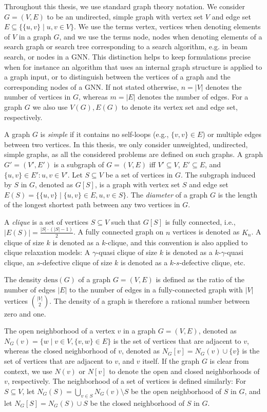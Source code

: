 \documentclass[draft,final]{vutinfth} %
\begin{document}
Throughout this thesis, we use standard graph theory notation. 
We consider $G = (V, E)$ to be an undirected, simple graph with vertex set $V$ and edge set $E \subseteq \{\{u,v\} \mid u,v \in V\}$. We use the terms vertex, vertices when denoting elements of $V$ in a graph $G$, and we use the terms node, nodes when denoting elements of a search graph or search tree corresponding to a search algorithm, e.g. in beam search, or nodes in a GNN. This distinction helps to keep formulations precise when for instance an algorithm that uses an internal graph structure is applied to a graph input, or to distinguish between the vertices of a graph and the corresponding nodes of a GNN. 
If not stated otherwise, $n = |V|$ denotes the number of vertices in $G$, whereas $m = |E|$ denotes the number of edges. 
For a graph $G$ we also use $V(G), E(G)$ to denote its vertex set and edge set, respectively. 

A graph $G$ is \emph{simple} if it contains no self-loops (e.g.,  $\{v,v\} \in E$) or multiple edges between two vertices. In this thesis, we only consider unweighted, undirected, simple graphs, as all the considered problems are defined on such graphs. 
A graph $G' = (V', E')$ is a subgraph of $G = (V,E)$ iff $V' \subseteq V$, $E' \subseteq E$, and $\{u,v\} \in E' \colon u,v \in V'$. Let $S \subseteq V$ be a set of vertices in $G$. The subgraph induced by $S$ in $G$, denoted as $G[S]$, is a graph with vertex set $S$ and edge set $E(S) = \{ \{u,v\} \mid \{u,v\} \in E, u,v \in S \}$. 
The \emph{diameter} of a graph $G$ is the length of the longest shortest path between any two vertices in $G$. 

A \emph{clique} is a set of vertices $S \subseteq V$ such that $G[S]$ is fully connected, i.e., $|E(S)| = \frac{|S| \cdot (|S|-1)}{2}$. A fully connected graph on $n$ vertices is denoted as $K_n$. A clique of size $k$ is denoted as a $k$-clique, and this convention is also applied to clique relaxation models: A $\gamma$-quasi clique of size $k$ is denoted as a $k$-$\gamma$-quasi clique, an $s$-defective clique of size $k$ is denoted as a $k$-$s$-defective clique, etc. 

The density $\mathrm{dens}(G)$ of a graph $G = (V,E)$ is defined as the ratio of the number of edges $|E|$ to the number of edges in a fully-connected graph with $|V|$ vertices $\binom{|V|}{2}$. 
The density of a graph is therefore a rational number between zero and one. 

The open neighborhood of a vertex $v$ in a graph $G = (V,E)$, denoted as $N_G(v) = \{ w \mid v \in V, \{v,w\} \in E\}$ is the set of vertices that are adjacent to $v$, whereas the closed neighborhood of $v$, denoted as $N_G[v] = N_G(v) \cup \{v\}$ is the set of vertices that are adjacent to $v$, and $v$ itself. 
If the graph $G$ is clear from context, we use $N(v)$ or $N[v]$ to denote the open and closed neighborhoods of $v$, respectively. 
The neighborhood of a set of vertices is defined similarly: For $S \subseteq V$, let $N_G(S) = \bigcup_{v \in S} N_G(v) \setminus S$ be the open neighborhood of $S$ in $G$, and let $N_G[S] = N_G(S) \cup S$ be the closed neighborhood of $S$ in $G$. 
\end{document}

